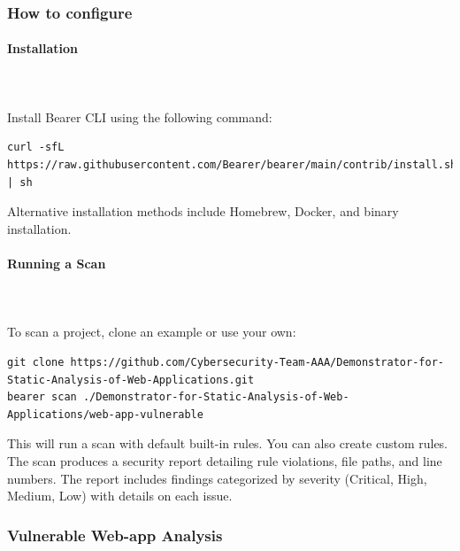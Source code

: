 \documentclass[]{article}
\begin{document}
\subsubsection{How to configure}

\paragraph{Installation} \mbox{} \\ \\
Install Bearer CLI using the following command:
\begin{lstlisting}[numbers=none]
curl -sfL https://raw.githubusercontent.com/Bearer/bearer/main/contrib/install.sh | sh
\end{lstlisting}
Alternative installation methods include Homebrew, Docker, and binary installation.

\paragraph{Running a Scan} \mbox{} \\ \\
To scan a project, clone an example or use your own:
\begin{lstlisting}[numbers=none]
git clone https://github.com/Cybersecurity-Team-AAA/Demonstrator-for-Static-Analysis-of-Web-Applications.git
bearer scan ./Demonstrator-for-Static-Analysis-of-Web-Applications/web-app-vulnerable
\end{lstlisting}
This will run a scan with default built-in rules. You can also create custom rules.
The scan produces a security report detailing rule violations, file paths, and line numbers. The report includes findings categorized by severity (Critical, High, Medium, Low) with details on each issue.

\subsubsection{Vulnerable Web-app Analysis}
\end{document}
